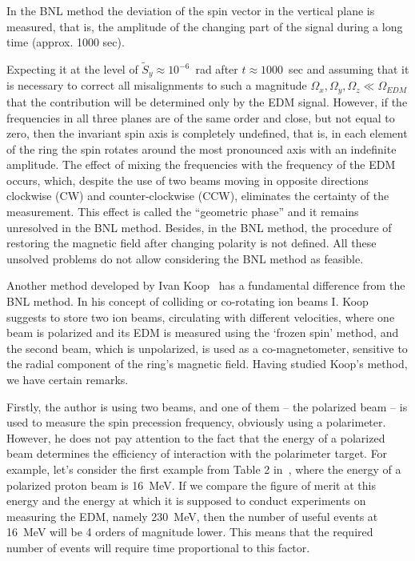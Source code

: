 \documentclass[a4paper]{jpconf}
\newcommand{\W}{\Omega}
\begin{document}
In the BNL method the deviation of the spin vector in the vertical plane is measured, that is, the amplitude of the changing part of the signal  during a long time (approx. 1000 sec). 

Expecting it at the level of $\tilde{S}_y\approx10^{-6}$~rad after $t\approx1000$~sec and assuming that it is necessary to correct all misalignments to such a magnitude $\W_x,\W_y, \W_z\ll\W_{EDM}$ that the contribution will be determined only by the EDM signal. However, if the frequencies in all three planes are of the same order and close, but not equal to zero, then the invariant spin axis is completely undefined, that is, in each element of the ring the spin rotates around the most pronounced axis with an indefinite amplitude. The effect of mixing the frequencies with the frequency of the EDM occurs, which, despite the use of two beams moving in opposite directions clockwise (CW) and counter-clockwise (CCW), eliminates the certainty of the measurement. This effect is called the ``geometric phase'' and it remains unresolved in the BNL method. Besides, in the BNL method, the procedure of restoring the magnetic field after changing polarity is not defined. All these unsolved problems do not allow considering the BNL method as feasible.

Another method developed by Ivan Koop~\cite{Koop2015} has a fundamental difference from the BNL method. In his concept of colliding or co-rotating ion beams I. Koop suggests to store two ion beams, circulating with different velocities, where one beam is polarized and its EDM is measured using the `frozen spin' method, and the second beam, which is unpolarized, is used as a co-magnetometer, sensitive to the radial component of the ring's magnetic field. Having studied Koop’s method, we have certain remarks. 

Firstly, the author is using two beams, and one of them -- the polarized beam -- is used to measure the spin precession frequency, obviously using a polarimeter. However, he does not pay attention to the fact that the energy of a polarized beam determines the efficiency of interaction with the polarimeter target. For example, let's consider the first example from Table 2 in~\cite{Koop2015}, where the energy of a polarized proton beam is 16~MeV. If we compare the figure of merit at this energy and the energy at which it is supposed to conduct experiments on measuring the EDM, namely 230~MeV, then the number of useful events at 16~MeV will be 4 orders of magnitude lower. This means that the required number of events will require time proportional to this factor.
\end{document}
